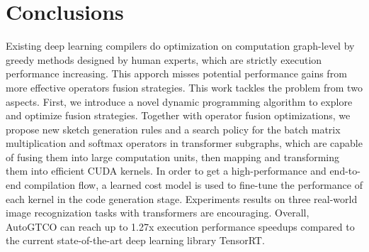 
\section{Conclusions}
Existing deep learning compilers do optimization on computation graph-level by greedy methods designed by human experts, which are strictly execution performance 
increasing. This apporch misses potential performance gains from more effective operators fusion strategies.
This work tackles the problem from two aspects. First, we introduce a novel dynamic programming algorithm to explore and optimize fusion strategies. 
Together with operator fusion optimizations, we propose new sketch generation rules and a search policy for the batch matrix multiplication and softmax operators in 
transformer subgraphs, which are capable of fusing them into large computation units, then mapping and transforming them into 
efficient CUDA kernels. In order to get a high-performance and end-to-end compilation flow, a learned cost model is used to fine-tune the performance of each kernel 
in the code generation stage. Experiments results on three real-world image recognization tasks with transformers are encouraging. Overall, AutoGTCO can reach up to
1.27x execution performance speedups compared to the current state-of-the-art deep learning library TensorRT.
  

\label{sec:conclu}


